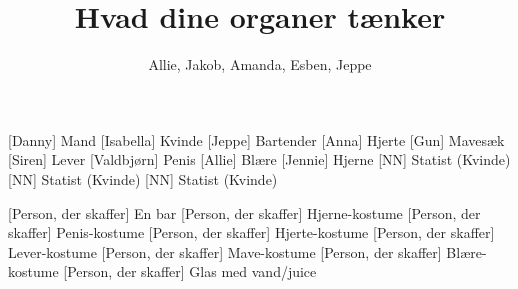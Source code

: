 \documentclass[a4paper,11pt]{article}
\title{Hvad dine organer tænker}
\author{Allie, Jakob, Amanda, Esben, Jeppe}
\begin{document}
\maketitle

\begin{roles}
    [Danny] Mand
    [Isabella] Kvinde
    [Jeppe] Bartender
    [Anna] Hjerte
    [Gun] Mavesæk
    [Siren] Lever
    [Valdbjørn] Penis
    [Allie] Blære
    [Jennie] Hjerne
    [NN] Statist (Kvinde)
    [NN] Statist (Kvinde)
    [NN] Statist (Kvinde)
\end{roles}

\begin{props}
    [Person, der skaffer] En bar
    [Person, der skaffer] Hjerne-kostume
    [Person, der skaffer] Penis-kostume
    [Person, der skaffer] Hjerte-kostume
    [Person, der skaffer] Lever-kostume
    [Person, der skaffer] Mave-kostume
    [Person, der skaffer] Blære-kostume
    [Person, der skaffer] Glas med vand/juice
\end{props}
\end{document}
